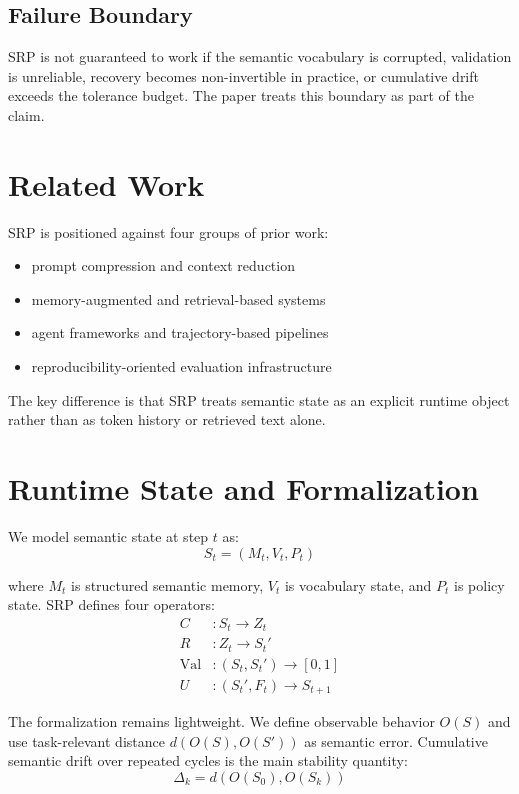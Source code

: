 \documentclass[11pt]{article}
\begin{document}
\subsection*{Failure Boundary}
SRP is not guaranteed to work if the semantic vocabulary is corrupted, validation is unreliable, recovery becomes non-invertible in practice, or cumulative drift exceeds the tolerance budget. The paper treats this boundary as part of the claim.

\section{Related Work}
SRP is positioned against four groups of prior work:
\begin{itemize}[leftmargin=*]
  \item prompt compression and context reduction
  \item memory-augmented and retrieval-based systems
  \item agent frameworks and trajectory-based pipelines
  \item reproducibility-oriented evaluation infrastructure
\end{itemize}

The key difference is that SRP treats semantic state as an explicit runtime object rather than as token history or retrieved text alone.

\section{Runtime State and Formalization}
We model semantic state at step $t$ as:
\begin{equation}
S_t = (M_t, V_t, P_t)
\end{equation}

where $M_t$ is structured semantic memory, $V_t$ is vocabulary state, and $P_t$ is policy state. SRP defines four operators:
\begin{align}
C &: S_t \to Z_t \\
R &: Z_t \to S_t' \\
\mathrm{Val} &: (S_t, S_t') \to [0,1] \\
U &: (S_t', F_t) \to S_{t+1}
\end{align}

The formalization remains lightweight. We define observable behavior $O(S)$ and use task-relevant distance $d(O(S), O(S'))$ as semantic error. Cumulative semantic drift over repeated cycles is the main stability quantity:
\begin{equation}
\Delta_k = d(O(S_0), O(S_k))
\end{equation}
\end{document}
